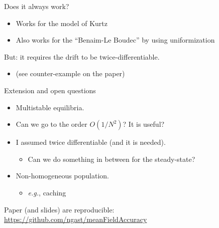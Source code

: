 \documentclass{beamer}
\newcommand\red[1]{{\color{red}#1}}
\begin{document}
\begin{frame}{Does it always work?}
  \begin{itemize}
  \item Works for the model of Kurtz
  \item Also works for the ``Benaim-Le Boudec'' by using uniformization
  \end{itemize}

  \bigskip
  But: it requires the drift to be \red{twice-differentiable}. 
  \begin{itemize}
  \item (see counter-example on the paper)
  \end{itemize}
\end{frame}


\begin{frame}{Extension and open questions}
  \begin{itemize}
  \item Multistable equilibria. 
  \item Can we go to the order $O(1/N^2)$? It is useful? 
  \item I assumed twice differentiable (and it is needed). 
    \begin{itemize}
    \item Can we do something in between for the steady-state? 
    \end{itemize}
  \item Non-homogeneous population. 
    \begin{itemize}
    \item \emph{e.g.}, caching 
    \end{itemize}
  \end{itemize}
  
  \bigskip
  
  Paper (and slides) are \red{reproducible}:
  \url{https://github.com/ngast/meanFieldAccuracy}
\end{frame}

\appendix
\end{document}

